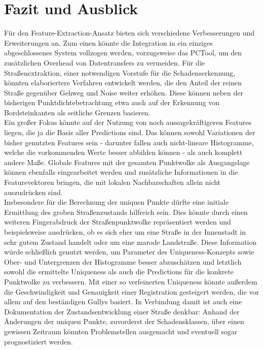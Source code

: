 
\chapter{Fazit und Ausblick}



Für den Feature-Extraction-Ansatz bieten sich verschiedene Verbesserungen und Erweiterungen an. Zum einen könnte die Integration in ein einziges abgeschlossenes System vollzogen werden, vorzugsweise das PCTool, um den zusätzlichen Overhead von Datentransfers zu vermeiden. Für die Straßenextraktion, einer notwendigen Vorstufe für die Schadenserkennung, könnten elaboriertere Verfahren entwickelt werden, die den Anteil der reinen Straße gegenüber Gehweg und Noise weiter erhöhen. Diese können neben der bisherigen Punktdichtebetrachtung etwa auch auf der Erkennung von Bordsteinkanten als seitliche Grenzen basieren. \\
Ein großer Fokus könnte auf der Nutzung von noch aussagekräftigeren Features liegen, die ja die Basis aller Predictions sind. Das können sowohl Variationen der bisher genutzten Features sein - darunter fallen auch nicht-lineare Histogramme, welche die vorkommenden Werte besser abbilden können - als auch komplett andere Maße. Globale Features mit der gesamten Punktwolke als Ausgangslage können ebenfalls eingearbeitet werden und zusätzliche Informationen in die Featurevektoren bringen, die mit lokalen Nachbarschaften allein nicht auszudrücken sind. \\
Insbesondere für die Berechnung der uniquen Punkte dürfte eine initiale Ermittlung des groben Straßenzustands hilfreich sein. Dies könnte durch einen weiteren Fingerabdruck der Straßenpunktwolke repräsentiert werden und beispielsweise ausdrücken, ob es sich eher um eine Straße in der Innenstadt in sehr gutem Zustand handelt oder um eine marode Landstraße. Diese Information würde schließlich genutzt werden, um Parameter des Uniqueness-Konzepts sowie Ober- und Untergrenzen der Histogramme besser abzuschätzen und letztlich sowohl die ermittelte Uniqueness als auch die Predictions für die konkrete Punktwolke zu verbessern. Mit einer so verfeinerten Uniqueness könnte außerdem die Geschwindigkeit und Genauigkeit einer Registration gesteigert werden, die vor allem auf den beständigen Gullys basiert. In Verbindung damit ist auch eine Dokumentation der Zustandsentwicklung einer Straße denkbar: Anhand der Änderungen der uniquen Punkte, zuvorderst der Schadensklassen, über einen gewissen Zeitraum könnten Problemstellen ausgemacht und eventuell sogar prognostiziert werden. \\
